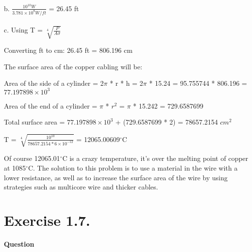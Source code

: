 \documentclass[a4paper, 12pt]{article}
\begin{document}
\paragraph{\newline}

b. $\frac{10^{10} W}{3.781\times10^8 W/ft}$ = 26.45 ft

\paragraph{\newline}

c. Using T = $\sqrt[4]{\frac{P}{A\sigma}}$\newline

Converting ft to cm: 26.45 ft = 806.196 cm\newline

The surface area of the copper cabling will be:\newline

Area of the side of a cylinder = 2$\pi$ * r * h = 2$\pi$ * 15.24 = 95.755744 * 806.196 = $77.197898\times10^3$\newline

Area of the end of a cylinder = $\pi$ * $r^{2}$ = $\pi$ * 15.242 = 729.6587699\newline

Total surface area = $77.197898\times10^3$ + (729.6587699 * 2) = 78657.2154 $cm^2$\newline

T = $\sqrt[4]{\frac{10^{10}}{78657.2154*6\times10^{-12}}}$ = 12065.00609$^\circ$C\newline

Of course 12065.01$^\circ$C is a crazy temperature, it's over the melting point of copper at 1085$^\circ$C. The solution to this problem is to use a material in the wire with a lower resistance, as well as to increase the surface area of the wire by using strategies such as multicore wire and thicker cables.\newline

\clearpage

\section{Exercise 1.7.}

\paragraph{Question\newline}
\end{document}
